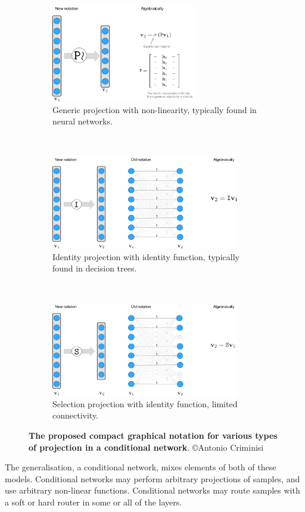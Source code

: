 \documentclass[thesis]{subfiles}
\begin{document}
\begin{figure}[htbp!] 
\centering
\begin{subfigure}[b]{\textwidth}
   \centering
   \includegraphics[width=0.7\textwidth]{projectionnotation}
   \caption{Generic projection with non-linearity, typically found in neural networks.}
   \label{fig:projectionnotation}
\end{subfigure}
~
\begin{subfigure}[b]{\textwidth}
   \centering
   \includegraphics[width=0.9\textwidth]{identitynotation}
   \caption{Identity projection with identity function, typically found in decision trees.}
   \label{fig:selectionnotation}
\end{subfigure}
~
\begin{subfigure}[b]{\textwidth}
   \centering
   \includegraphics[width=0.9\textwidth]{selectionnotation}
   \caption{Selection projection with identity function, limited connectivity.}
   \label{fig:selectionnotation}
\end{subfigure}
\caption[Various projection matrices in conditional networks.]{{\bf The proposed compact graphical notation for various types of projection in a conditional network}. \copyright Antonio Criminisi}
\label{fig:projections}
\end{figure}

The generalisation, a conditional network, mixes elements of both of these models. Conditional networks may perform arbitrary projections of samples, and use arbitrary non-linear functions. Conditional networks may route samples with a soft or hard router in some or all of the layers.
\end{document}
